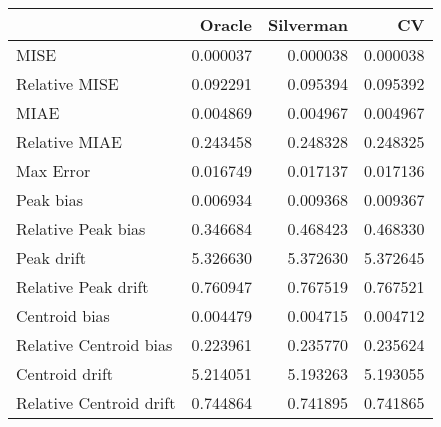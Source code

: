 \begin{tabular}{lrrr}
  \hline
 & Oracle & Silverman & CV \\ 
  \hline
MISE & 0.000037 & 0.000038 & 0.000038 \\ 
  Relative MISE & 0.092291 & 0.095394 & 0.095392 \\ 
  MIAE & 0.004869 & 0.004967 & 0.004967 \\ 
  Relative MIAE & 0.243458 & 0.248328 & 0.248325 \\ 
  Max Error & 0.016749 & 0.017137 & 0.017136 \\ 
  Peak bias & 0.006934 & 0.009368 & 0.009367 \\ 
  Relative Peak bias & 0.346684 & 0.468423 & 0.468330 \\ 
  Peak drift & 5.326630 & 5.372630 & 5.372645 \\ 
  Relative Peak drift & 0.760947 & 0.767519 & 0.767521 \\ 
  Centroid bias & 0.004479 & 0.004715 & 0.004712 \\ 
  Relative Centroid bias & 0.223961 & 0.235770 & 0.235624 \\ 
  Centroid drift & 5.214051 & 5.193263 & 5.193055 \\ 
  Relative Centroid drift & 0.744864 & 0.741895 & 0.741865 \\ 
   \hline
\end{tabular}
